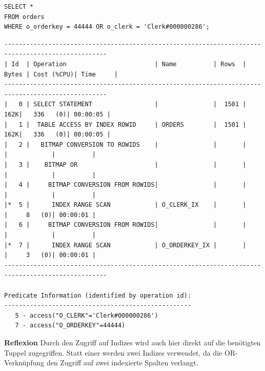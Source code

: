 \documentclass[10pt]{article}
\begin{document}
\begin{lstlisting}[style=sql]
SELECT *
FROM orders
WHERE o_orderkey = 44444 OR o_clerk = 'Clerk#000000286';
\end{lstlisting}
\begin{lstlisting}[style=queryexecutionplanSmall]
--------------------------------------------------------------------------------------------------
| Id  | Operation                        | Name          | Rows  | Bytes | Cost (%CPU)| Time     |
--------------------------------------------------------------------------------------------------
|   0 | SELECT STATEMENT                 |               |  1501 |   162K|   336   (0)| 00:00:05 |
|   1 |  TABLE ACCESS BY INDEX ROWID     | ORDERS        |  1501 |   162K|   336   (0)| 00:00:05 |
|   2 |   BITMAP CONVERSION TO ROWIDS    |               |       |       |            |          |
|   3 |    BITMAP OR                     |               |       |       |            |          |
|   4 |     BITMAP CONVERSION FROM ROWIDS|               |       |       |            |          |
|*  5 |      INDEX RANGE SCAN            | O_CLERK_IX    |       |       |     8   (0)| 00:00:01 |
|   6 |     BITMAP CONVERSION FROM ROWIDS|               |       |       |            |          |
|*  7 |      INDEX RANGE SCAN            | O_ORDERKEY_IX |       |       |     3   (0)| 00:00:01 |
--------------------------------------------------------------------------------------------------

Predicate Information (identified by operation id):
---------------------------------------------------
   5 - access("O_CLERK"='Clerk#000000286')
   7 - access("O_ORDERKEY"=44444)
\end{lstlisting}
\textbf{Reflexion} \newline
Durch den Zugriff auf Indizes wird auch hier direkt auf die benötigten Tuppel zugegriffen.
Statt einer werden zwei Indizes verwendet, da die OR-Verknüpfung den Zugriff auf zwei indexierte Spalten verlangt.
\end{document}
